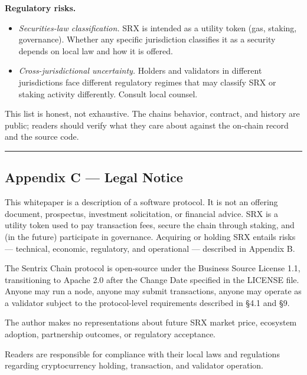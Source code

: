 \documentclass[11pt,a4paper]{article}
\providecommand{\tightlist}{\setlength{\itemsep}{0pt}\setlength{\parskip}{0pt}}
\begin{document}
\textbf{Regulatory risks.}

\begin{itemize}
\tightlist
\item
  \emph{Securities-law classification.} SRX is intended as a utility
  token (gas, staking, governance). Whether any specific jurisdiction
  classifies it as a security depends on local law and how it is
  offered.
\item
  \emph{Cross-jurisdictional uncertainty.} Holders and validators in
  different jurisdictions face different regulatory regimes that may
  classify SRX or staking activity differently. Consult local counsel.
\end{itemize}

This list is honest, not exhaustive. The chain\textquotesingle s
behavior, contract, and history are public; readers should verify what
they care about against the on-chain record and the source code.

\begin{center}\rule{0.5\linewidth}{0.5pt}\end{center}

\hypertarget{appendix-c--legal-notice}{%
\subsection{Appendix C --- Legal
Notice}\label{appendix-c--legal-notice}}

This whitepaper is a description of a software protocol. It is not an
offering document, prospectus, investment solicitation, or financial
advice. SRX is a utility token used to pay transaction fees, secure the
chain through staking, and (in the future) participate in governance.
Acquiring or holding SRX entails risks --- technical, economic,
regulatory, and operational --- described in Appendix B.

The Sentrix Chain protocol is open-source under the Business Source
License 1.1, transitioning to Apache 2.0 after the Change Date specified
in the LICENSE file. Anyone may run a node, anyone may submit
transactions, anyone may operate as a validator subject to the
protocol-level requirements described in §4.1 and §9.

The author makes no representations about future SRX market price,
ecosystem adoption, partnership outcomes, or regulatory acceptance.

Readers are responsible for compliance with their local laws and
regulations regarding cryptocurrency holding, transaction, and validator
operation.
\end{document}
